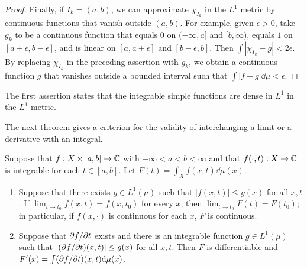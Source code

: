 \begin{proof}
    Finally, if $I_{k} = (a, b)$, we can approximate $\chi_{I_k}$ in the $L^1$ metric by continuous functions that vanish outside $(a, b)$.
    For example, given $\epsilon > 0$, take $g_k$ to be a continuous function that equals $0$ on $(-\infty, a]$ and $[b, \infty)$, equals $1$ on $[a+\epsilon, b-\epsilon]$, and is linear on $[a, a+\epsilon]$ and $[b-\epsilon, b]$.
    Then $\int |\chi_{I_k} - g| < 2 \epsilon$.
    By replacing $\chi_{I_k}$ in the preceding assertion with $g_k$, we obtain a continuous function $g$ that vanishes outside a bounded interval such that $\int |f - g| \dd \mu < \epsilon$.
\end{proof}

The first assertion states that the integrable simple functions are dense in $L^1$ in the $L^1$ metric.

The next theorem gives a criterion for the validity of interchanging a limit or a derivative with an integral. 

\begin{theorem}
    Suppose that $f: X \times [a, b] \to \mathbb{C}$ with $-\infty < a < b < \infty$ and that $f(\cdot, t): X \to \mathbb{C}$ is integrable for each $t \in [a, b]$.
    Let $F(t) = \int_X f(x,t) \dd \mu(x)$.
    \begin{enumerate}
        \item Suppose that there exists $g\in L^1(\mu)$ such that $|f(x,t)| \le g(x)$ for all $x, t$. If $\lim_{t \to t_0} f(x, t) = f(x, t_0)$ for every $x$, then $\lim_{t \to t_0} F(t) = F(t_0)$; in particular, if $f(x, \cdot)$ is continuous for each $x$, $F$ is continuous.
        \item Suppose that $\partial f / \partial t$ exists and there is an integrable function $g \in L^1(\mu)$ such that $|(\partial f / \partial t)(x, t)| \le g(x)$ for all $x, t$. Then $F$ is differentiable and $F'(x) = \int (\partial f / \partial t)(x,t) \mathrm{d} \mu(x)$.
    \end{enumerate} 
\end{theorem}


